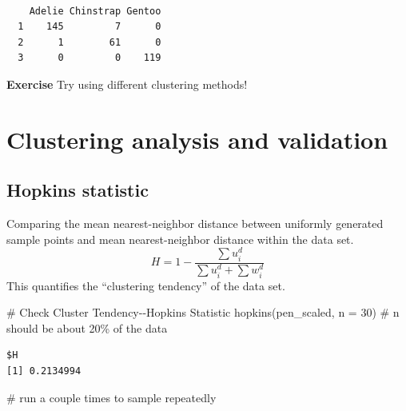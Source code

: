 \documentclass[
  letterpaper,
  DIV=11,
  numbers=noendperiod]{scrreprt}
\newenvironment{Shaded}{\begin{snugshade}}{\end{snugshade}}
\newcommand{\AttributeTok}[1]{\textcolor[rgb]{0.40,0.45,0.13}{#1}}
\newcommand{\CommentTok}[1]{\textcolor[rgb]{0.37,0.37,0.37}{#1}}
\newcommand{\DecValTok}[1]{\textcolor[rgb]{0.68,0.00,0.00}{#1}}
\newcommand{\FunctionTok}[1]{\textcolor[rgb]{0.28,0.35,0.67}{#1}}
\newcommand{\NormalTok}[1]{\textcolor[rgb]{0.00,0.23,0.31}{#1}}
\newcommand{\SpecialCharTok}[1]{\textcolor[rgb]{0.37,0.37,0.37}{#1}}
\begin{document}
\begin{Shaded}
\end{Shaded}

\begin{verbatim}
   
    Adelie Chinstrap Gentoo
  1    145         7      0
  2      1        61      0
  3      0         0    119
\end{verbatim}

\textbf{Exercise} Try using different clustering methods!

\hypertarget{clustering-analysis-and-validation}{%
\section{Clustering analysis and
validation}\label{clustering-analysis-and-validation}}

\hypertarget{hopkins-statistic}{%
\subsection{Hopkins statistic}\label{hopkins-statistic}}

Comparing the mean nearest-neighbor distance between uniformly generated
sample points and mean nearest-neighbor distance within the data set. \[
H = 1 - \frac{\sum u^d_i}{\sum u^d_i + \sum w^d_i}
\] This quantifies the ``clustering tendency'' of the data set.

\begin{Shaded}
\begin{Highlighting}[]
\CommentTok{\# Check Cluster Tendency{-}{-}Hopkins Statistic}
\FunctionTok{hopkins}\NormalTok{(pen\_scaled, }\AttributeTok{n =} \DecValTok{30}\NormalTok{) }\CommentTok{\# n should be about 20\% of the data}
\end{Highlighting}
\end{Shaded}

\begin{verbatim}
$H
[1] 0.2134994
\end{verbatim}

\begin{Shaded}
\begin{Highlighting}[]
\CommentTok{\# run a couple times to sample repeatedly}
\end{Highlighting}
\end{Shaded}
\end{document}
